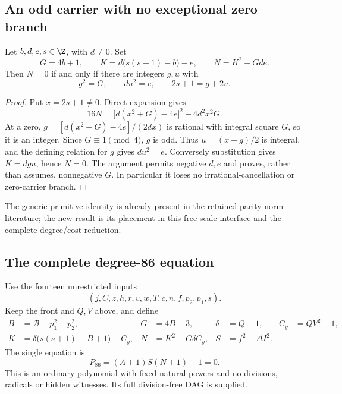 \subsection{An odd carrier with no exceptional zero branch}
\begin{lemma}
Let $b,d,e,s\in\Z$, with $d\ne0$. Set
\[
 G=4b+1,\qquad K=d\bigl(s(s+1)-b\bigr)-e,
 \qquad N=K^2-Gde.
\]
Then $N=0$ if and only if there are integers $g,u$ with
\[
 g^2=G,\qquad du^2=e,\qquad 2s+1=g+2u.
\]
\end{lemma}
\begin{proof}
Put $x=2s+1\ne0$. Direct expansion gives
\[
 16N=\bigl[d(x^2+G)-4e\bigr]^2-4d^2x^2G.
\]
At a zero, $g=[d(x^2+G)-4e]/(2dx)$ is rational with integral square $G$,
so it is an integer. Since $G\equiv1\pmod4$, $g$ is odd. Thus
$u=(x-g)/2$ is integral, and the defining relation for $g$ gives $du^2=e$.
Conversely substitution gives $K=dgu$, hence $N=0$.
The argument permits negative $d,e$ and proves, rather than assumes,
nonnegative $G$. In particular it loses no irrational-cancellation or
zero-carrier branch.
\end{proof}
The generic primitive identity is already present in the retained parity-norm
literature; the new result is its placement in this free-scale interface and
the complete degree/cost reduction.

\subsection{The complete degree-86 equation}
Use the fourteen unrestricted inputs
\[
 (j,C,z,h,r,v,w,T,c,n,f,p_2,p_1,s).
\]
Keep the front and $Q,V$ above, and define
\begin{align*}
 B&=\mathcal B-p_1^2-p_2^2,&G&=4B-3,&\delta&=Q-1,&C_y&=QV^2-1,\\
 K&=\delta\bigl(s(s+1)-B+1\bigr)-C_y,&
 N&=K^2-G\delta C_y,&S&=f^2-\Delta I^2.
\end{align*}
The single equation is
\begin{equation}\label{eq:root86}
 \boxed{\;P_{86}=(A+1)S(N+1)-1=0.\;}
\end{equation}
This is an ordinary polynomial with fixed natural powers and no divisions,
radicals or hidden witnesses. Its full division-free DAG is supplied.

